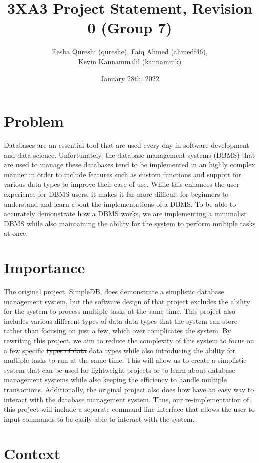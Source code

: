 \documentclass[12pt,letterpaper]{article}
\title{3XA3 Project Statement, Revision 0 (Group 7)}
\author{Eesha Qureshi (qureshe), Faiq Ahmed (ahmedf46),\\ Kevin Kannammalil (kannammk)}
\date{January 28th, 2022}
\begin{document}
\maketitle

\section*{Problem}

Databases are an essential tool that are used every day in software development and data science. Unfortunately, the database management systems (DBMS) that are used to manage these databases tend to be implemented in an highly complex manner in order to include features such as custom functions and support for various data types to improve their ease of use. While this enhances the user experience for DBMS users, it makes it far more difficult for beginners to understand and learn about the implementations of a DBMS. To be able to accurately demonstrate how a DBMS works, we are implementing a minimalist DBMS while also maintaining the ability for the system to perform multiple tasks at once.

\section*{Importance}

The original project, SimpleDB, does demonstrate a simplistic database management system, but the software design of that project excludes the ability for the system to process multiple tasks at the same time. This project also includes various different \sout{types of data} {\color{red}data types} that the system can store rather than focusing on just a few, which over complicates the system. By rewriting this project, we aim to reduce the complexity of this system to focus on a few specific \sout{types of data} {\color{red}data types} while also introducing the ability for multiple tasks to run at the same time. This will allow us to create a simplistic system that can be used for lightweight projects or to learn about database management systems while also keeping the efficiency to handle multiple transactions. {\color{red}Additionally, the original project also does how have an easy way to interact with the database management system. Thus, our re-implementation of this project will include a separate command line interface that allows the user to input commands to be easily able to interact with the system.}

\section*{Context}
\end{document}
